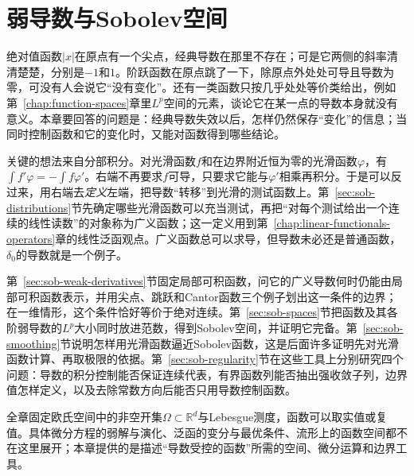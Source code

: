 \chapter{弱导数与Sobolev空间}
\label{chap:weak-derivatives-sobolev}

绝对值函数$|x|$在原点有一个尖点，经典导数在那里不存在；可是它两侧的斜率清清楚楚，分别是$-1$和$1$。阶跃函数在原点跳了一下，除原点外处处可导且导数为零，可没有人会说它“没有变化”。还有一类函数只按几乎处处等价类给出，例如第~\ref{chap:function-spaces}章里$L^p$空间的元素，谈论它在某一点的导数本身就没有意义。本章要回答的问题是：经典导数失效以后，怎样仍然保存“变化”的信息；当同时控制函数和它的变化时，又能对函数得到哪些结论。

关键的想法来自分部积分。对光滑函数$f$和在边界附近恒为零的光滑函数$\varphi$，有$\int f'\varphi=-\int f\varphi'$。右端不再要求$f$可导，只要求它能与$\varphi'$相乘再积分。于是可以反过来，用右端去\emph{定义}左端，把导数“转移”到光滑的测试函数上。第~\ref{sec:sob-distributions}节先确定哪些光滑函数可以充当测试，再把“对每个测试给出一个连续的线性读数”的对象称为广义函数；这一定义用到第~\ref{chap:linear-functionals-operators}章的线性泛函观点。广义函数总可以求导，但导数未必还是普通函数，$\delta_0$的导数就是一个例子。

第~\ref{sec:sob-weak-derivatives}节固定局部可积函数，问它的广义导数何时仍能由局部可积函数表示，并用尖点、跳跃和Cantor函数三个例子划出这一条件的边界；在一维情形，这个条件恰好等价于绝对连续。第~\ref{sec:sob-spaces}节把函数及其各阶弱导数的$L^p$大小同时放进范数，得到Sobolev空间，并证明它完备。第~\ref{sec:sob-smoothing}节说明怎样用光滑函数逼近Sobolev函数，这是后面许多证明先对光滑函数计算、再取极限的依据。第~\ref{sec:sob-regularity}节在这些工具上分别研究四个问题：导数的积分控制能否保证连续代表，有界函数列能否抽出强收敛子列，边界值怎样定义，以及去除常数方向后能否只用导数控制函数。

全章固定欧氏空间中的非空开集$\Omega\subset\mathbb R^d$与Lebesgue测度，函数可以取实值或复值。具体微分方程的弱解与演化、泛函的变分与最优条件、流形上的函数空间都不在这里展开；本章提供的是描述“导数受控的函数”所需的空间、微分运算和边界工具。







